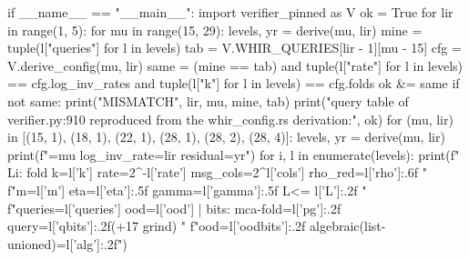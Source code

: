 \begin{srccode}
if __name__ == "__main__":
    import verifier_pinned as V
    ok = True
    for lir in range(1, 5):
        for mu in range(15, 29):
            levels, yr = derive(mu, lir)
            mine = tuple(l["queries"] for l in levels)
            tab = V.WHIR_QUERIES[lir - 1][mu - 15]
            cfg = V.derive_config(mu, lir)
            same = (mine == tab) and tuple(l["rate"] for l in levels) == cfg.log_inv_rates and tuple(l["k"] for l in levels) == cfg.folds
            ok &= same
            if not same:
                print("MISMATCH", lir, mu, mine, tab)
    print("query table of verifier.py:910 reproduced from the whir_config.rs derivation:", ok)
    for (mu, lir) in [(15, 1), (18, 1), (22, 1), (28, 1), (28, 2), (28, 4)]:
        levels, yr = derive(mu, lir)
        print(f"\nmu={mu} log_inv_rate={lir} residual={yr}")
        for i, l in enumerate(levels):
            print(f"  L{i}: fold k={l['k']} rate=2^-{l['rate']} msg_cols=2^{l['cols']} rho_red={l['rho']:.6f} "
                  f"m={l['m']} eta={l['eta']:.5f} gamma={l['gamma']:.5f} L<= {l['L']:.2f} "
                  f"queries={l['queries']} ood={l['ood']} | bits: mca-fold={l['pg']:.2f} query={l['qbits']:.2f}(+17 grind) "
                  f"ood={l['oodbits']:.2f} algebraic(list-unioned)={l['alg']:.2f}")
\end{srccode}

